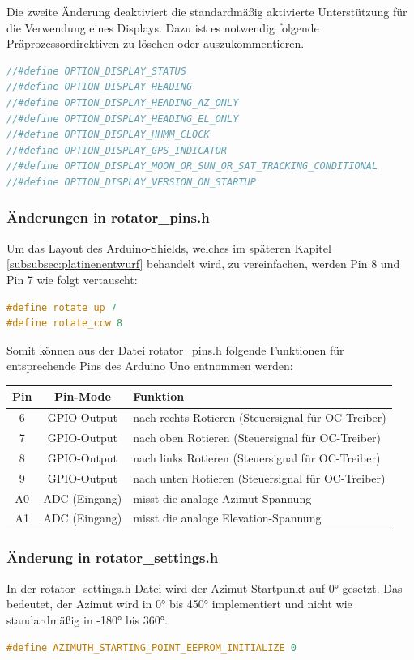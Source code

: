 Die zweite Änderung deaktiviert die standardmäßig aktivierte Unterstützung für die Verwendung eines Displays. Dazu ist es notwendig folgende Präprozessordirektiven zu löschen oder auszukommentieren.
\begin{lstlisting}[language=C++]
//#define OPTION_DISPLAY_STATUS
//#define OPTION_DISPLAY_HEADING
//#define OPTION_DISPLAY_HEADING_AZ_ONLY
//#define OPTION_DISPLAY_HEADING_EL_ONLY
//#define OPTION_DISPLAY_HHMM_CLOCK
//#define OPTION_DISPLAY_GPS_INDICATOR 
//#define OPTION_DISPLAY_MOON_OR_SUN_OR_SAT_TRACKING_CONDITIONAL
//#define OPTION_DISPLAY_VERSION_ON_STARTUP
\end{lstlisting}

\subsubsection{Änderungen in rotator\_pins.h}
Um das Layout des Arduino-Shields, welches im späteren Kapitel \ref{subsubsec:platinenentwurf} behandelt wird, zu vereinfachen, werden Pin 8 und Pin 7 wie folgt vertauscht:
\begin{lstlisting}[language=C++]
#define rotate_up 7
#define rotate_ccw 8
\end{lstlisting}

Somit können aus der Datei rotator\_pins.h folgende Funktionen für entsprechende Pins des Arduino Uno entnommen werden:

\begin{table}
	\centering
	\begin{tabular}{| c | c | l |}
		\hline
		\textbf{Pin} & \textbf{Pin-Mode} & \textbf{Funktion} \\
		\hline
		6 & GPIO-Output & nach rechts Rotieren (Steuersignal für OC-Treiber) \\
		\hline
		7 & GPIO-Output & nach oben Rotieren (Steuersignal für OC-Treiber) \\
		\hline
		8 & GPIO-Output & nach links Rotieren (Steuersignal für OC-Treiber) \\
		\hline
		9 & GPIO-Output & nach unten Rotieren (Steuersignal für OC-Treiber) \\
		\hline
		A0 & ADC (Eingang) & misst die analoge Azimut-Spannung \\
		\hline
		A1 & ADC (Eingang) & misst die analoge Elevation-Spannung \\
		\hline
	\end{tabular}
\end{table}
	
\subsubsection{Änderung in rotator\_settings.h}
In der rotator\_settings.h Datei wird der Azimut Startpunkt auf 0° gesetzt. Das bedeutet, der Azimut wird in 0° bis 450° implementiert und nicht wie standardmäßig in -180° bis 360°.
\begin{lstlisting}[language=C++]
#define AZIMUTH_STARTING_POINT_EEPROM_INITIALIZE 0
\end{lstlisting}


